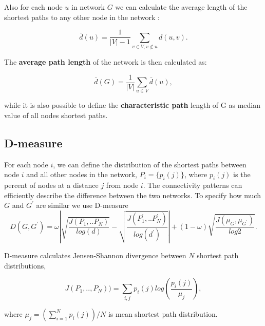 Also for each node $u$ in network $G$ we can calculate the average length of the shortest paths to any other node in the network \cite{van2010graph}:


\begin{equation}
\bar{d}(u) = \frac{1}{|V|-1} \sum_{v\in V, v \notin u} d(u,v).
\end{equation}

The \textbf{average path length} of the network is then calculated as:


\begin{equation}
\bar{d}(G) = \frac{1}{|V|}\sum_{u \in V} \bar{d}(u),
\end{equation}

while it is also possible to define the \textbf{characteristic path} length of G as median value of all nodes shortest paths. %


\subsection{D-measure}

For each node $i$, we can define the distribution of the shortest paths between node $i$ and all other nodes in the network, $P_{i}=\{p_{i}(j)\}$, where $p_{i}(j)$ is the percent of nodes at a distance $j$ from node $i$. The connectivity patterns can efficiently describe the difference between the two networks.    
To specify how much $G$ and $G^{'}$ are similar we use D-measure \cite{tiago2}
\begin{equation}
D(G, G^{'}) = \omega \left| \sqrt{\frac{J(P_1,..P_N)}{log(d)}}-\sqrt{\frac{J(P_1^{'},..P_N^{'})}{log(d^{'})}} \right| + (1-\omega) \sqrt{\frac{J(\mu_{G},\mu_{G^{'}})}{log2}}.
\label{eq:dmeasure}
\end{equation}

D-measure calculates Jensen-Shannon divergence between $N$ shortest path distributions,

\begin{equation}
J(P_1,.., P_N)) = \sum_{i,j}p_i(j)log(\frac{p_i(j)}{\mu_j}),
\end{equation}

where  $\mu_j = (\sum_{i=1}^N p_i(j))/N$ is mean shortest path distribution.

